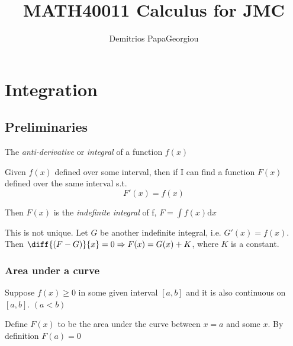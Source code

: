\documentclass[12pt]{report}
\author{Demitrios PapaGeorgiou}
\title{MATH40011 Calculus for JMC}
\theoremstyle{definition}
\begin{document}
\maketitle
\tableofcontents

\chapter{Integration}
\section{Preliminaries}
    The \emph{anti-derivative} or \emph{integral} of a function $f(x)$
    
    Given $f(x)$ defined over some interval, then if I can find a function $F(x)$ defined over the same interval
    s.t. \[F'(x) = f(x)\]

    Then $F(x)$ is the \emph{indefinite integral} of f, $F = \int f(x) \mathrm{d}x$

    This is not unique.
    Let $G$ be another indefinite integral, i.e. $G'(x) = f(x)$. Then $\diff {(F-G)}{x} = 0 \Rightarrow F(x)=G(x)+K$, 
    where $K$ is a constant.

\subsection{Area under a curve}
Suppose $f(x)\ge0$ in some given interval $[a,b]$ and it is also continuous on $[a,b]$. $(a<b)$ 

Define $F(x)$ to be the area under the curve between $x=a$ and some $x$. By definition $F(a)=0$
\end{document}
